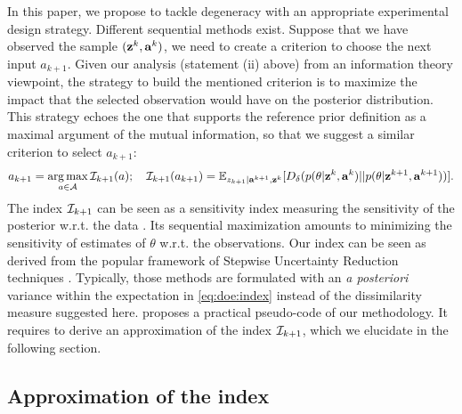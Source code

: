 In this paper, we propose to tackle degeneracy with an appropriate experimental design strategy. 
Different sequential methods exist. Suppose that we have observed the sample $(\mathbf{z}^k,\mathbf{a}^k)$, we need to create a criterion to choose the next input $a_{k+1}$. 
Given our analysis (statement (ii) above) from an information theory viewpoint, the strategy to build the mentioned criterion is to maximize the impact that the selected observation would have on the posterior distribution. 
This strategy echoes the one that supports the reference prior definition as a maximal argument of the mutual information, so that we suggest a similar criterion to select $a_{k+1}$:
      \begin{equation}\label{eq:doe:index}
        a_{k+1}=\operatorname*{arg\,max}_{a\in\mathcal{A}}\mathcal{I}_{k+1}(a);\quad 
            \mathcal{I}_{k+1}(a_{k+1}) = \mathbb{E}_{{z_{k+1}}|\mathbf{a}^{k+1},\mathbf{z}^k}[D_\delta(p(\theta|\mathbf{z}^k,\mathbf{a}^k)||p(\theta|\mathbf{z}^{k+1},\mathbf{a}^{k+1}))].
    \end{equation}
The index $\mathcal{I}_{k+1}$ can be seen as a sensitivity index measuring the sensitivity of the posterior w.r.t. the data \citep{da_veiga_global_2015}. Its sequential maximization amounts to minimizing the sensitivity of estimates of $\theta$ w.r.t. the observations.
Our index can be seen as derived from the popular framework of Stepwise Uncertainty Reduction techniques \citep{bect_supermartingale_2019}. 
Typically,  those methods are formulated with an \emph{a posteriori} variance within the expectation in \cref{eq:doe:index} instead of the dissimilarity measure suggested here.
 proposes a practical pseudo-code of our methodology. It requires to derive an approximation of the index $\mathcal{I}_{k+1}$, which we elucidate in the following section.


\subsection{Approximation of the index}

